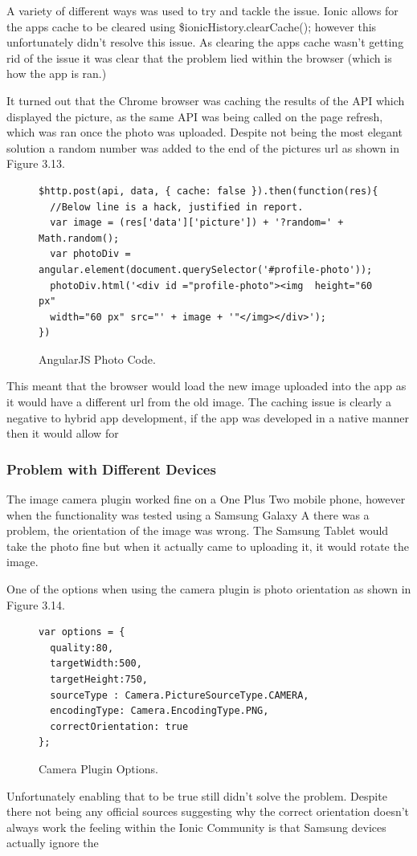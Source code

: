 A variety of different ways was used to try and tackle the issue. Ionic allows for the apps cache to be cleared using \$ionicHistory.clearCache(); however this unfortunately didn't resolve this issue. As clearing the apps cache wasn't getting rid of the issue it was clear that the problem lied within the browser (which is how the app is ran.)

It turned out that the Chrome browser was caching the results of the API which displayed the picture, as the same API was being called on the page refresh, which was ran once the photo was uploaded. Despite not being the most elegant solution a random number was added to the end of the pictures url as shown in Figure 3.13.
\begin{center}
\begin{figure}[H]
\begin{verbatim}
$http.post(api, data, { cache: false }).then(function(res){
  //Below line is a hack, justified in report.
  var image = (res['data']['picture']) + '?random=' + Math.random();
  var photoDiv = angular.element(document.querySelector('#profile-photo'));
  photoDiv.html('<div id ="profile-photo"><img  height="60 px" 
  width="60 px" src="' + image + '"</img></div>');
})
\end{verbatim}
\caption{AngularJS Photo Code.}
\end{figure}
\end{center}

This meant that the browser would load the new image uploaded into the app as it would have a different url from the old image. The caching issue is clearly a negative to hybrid app development, if the app was developed in a native manner then it would allow for 

\subsubsection{Problem with Different Devices}
The image camera plugin worked fine on a One Plus Two mobile phone, however when the functionality was tested using a Samsung Galaxy A there was a problem, the orientation of the image was wrong. The Samsung Tablet would take the photo fine but when it actually came to uploading it, it would rotate the image. 

One of the options when using the camera plugin is photo orientation as shown in Figure 3.14. 
\begin{center}
\begin{figure}[H]
\begin{verbatim}
var options = {
  quality:80,
  targetWidth:500,
  targetHeight:750,
  sourceType : Camera.PictureSourceType.CAMERA,
  encodingType: Camera.EncodingType.PNG,
  correctOrientation: true
};
\end{verbatim}
\caption{Camera Plugin Options.}
\end{figure}
\end{center}
Unfortunately enabling that to be true still didn't solve the problem. Despite there not being any official sources suggesting why the correct orientation doesn't always work the feeling within the Ionic Community is that Samsung devices actually ignore the  
